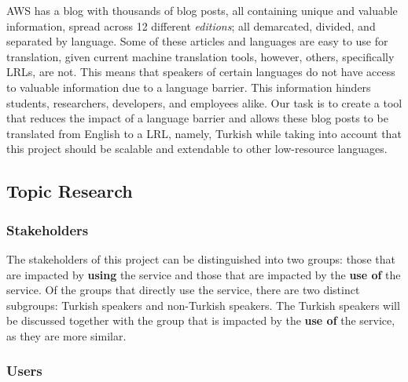 \indent \indent AWS has a blog with thousands of blog posts, all containing unique and valuable information, spread across 12 different \textit{editions}; all demarcated, divided, and separated by language. Some of these articles and languages are easy to use for translation, given current machine translation tools, however, others, specifically \acrfull{LRL}s, are not. This means that speakers of certain languages do not have access to valuable information due to a language barrier. This information hinders students, researchers, developers, and employees alike. Our task is to create a tool that reduces the impact of a language barrier and allows these blog posts to be translated from English to a \acrfull{LRL}, namely, Turkish while taking into account that this project should be scalable and extendable to other low-resource languages. 

\subsection{Topic Research}


\subsubsection{Stakeholders}

\indent \indent The stakeholders of this project can be distinguished into two groups: those that are impacted by \textbf{using} the service and those that are impacted by the \textbf{use of} the service. Of the groups that directly use the service, there are two distinct subgroups: Turkish speakers and non-Turkish speakers. The Turkish speakers will be discussed together with the group that is impacted by the \textbf{use of} the service, as they are more similar. 

\subsubsection*{Users}

